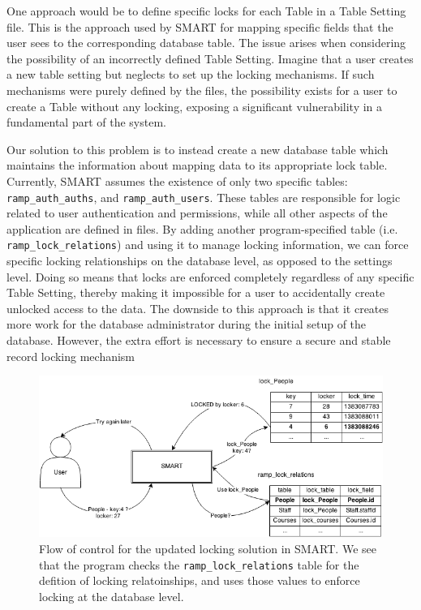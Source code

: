 \documentclass[12pt]{article}
\newcommand{\code}[1]{\texttt{#1}}
\begin{document}
One approach would be to define specific locks for each Table in a Table Setting file. This is the approach used by SMART for mapping specific fields that the user sees to the corresponding database table. The issue arises when considering the possibility of an incorrectly defined Table Setting. Imagine that a user creates a new table setting but neglects to set up the locking mechanisms. If such mechanisms were purely defined by the files, the possibility exists for a user to create a Table without any locking, exposing a significant vulnerability in a fundamental part of the system.

Our solution to this problem is to instead create a new database table which maintains the information about mapping data to its appropriate lock table. Currently, SMART assumes the existence of only two specific tables: \code{ramp\_auth\_auths}, and \code{ramp\_auth\_users}. These tables are responsible for logic related to user authentication and permissions, while all other aspects of the application are defined in files. By adding another program-specified table (i.e. \code{ramp\_lock\_relations}) and using it to manage locking information, we can force specific locking relationships on the database level, as opposed to the settings level. Doing so means that locks are enforced completely regardless of any specific Table Setting, thereby making it impossible for a user to accidentally create unlocked access to the data. The downside to this approach is that it creates more work for the database administrator during the initial setup of the database. However, the extra effort is necessary to ensure a secure and stable record locking mechanism

\newpage

\begin{center}
\begin{figure}[h]
    \vspace{-10pt}
    \centering
    \centerline{\includegraphics[width=6.5in]{diagrams/SecondLockDesign.png}}
    \begin{spacing}{1.0}\caption{Flow of control for the updated locking solution in SMART. We see that the program checks the \code{ramp\_lock\_relations} table for the defition of locking relatoinships, and uses those values to enforce locking at the database level.}\end{spacing}
    \vspace{-20pt}
\end{figure}
\end{center}
\end{document}
